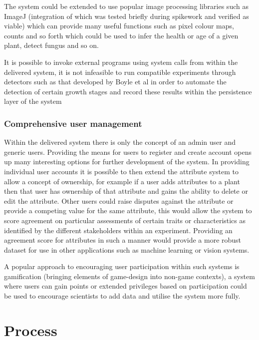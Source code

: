 The system could be extended to use popular image processing libraries such as ImageJ (integration of which was tested briefly during spikework and verified as viable) which can provide many useful functions such as pixel colour maps, counts and so forth which could be used to infer the health or age of a given plant, detect fungus and so on. 

It is possible to invoke external programs using system calls from within the delivered system, it is not infeasible to run compatible experiments through detectors such as that developed by Boyle et al\cite{boyle_image-based_2015} in order to automate the detection of certain growth stages and record these results within the persistence layer of the system


\subsubsection{Comprehensive user management}
Within the delivered system there is only the concept of an admin user and generic users. Providing the means for users to register and create account opens up many interesting options for further development of the system. In providing individual user accounts it is possible to then extend the attribute system to allow a concept of ownership, for example if a user adds attributes to a plant then that user has ownership of that attribute and gains the ability to delete or edit the attribute. Other users could raise disputes against the attribute or provide a competing value for the same attribute, this would allow the system to score agreement on particular assessments of certain traits or characteristics as identified by the different stakeholders within an experiment. Providing an agreement score for attributes in such a manner would provide a more robust dataset for use in other applications such as machine learning or vision systems.

A popular approach to encouraging user participation within such systems is gamification (bringing elements of game-design into non-game contexts), a system where users can gain points or extended privileges based on participation could be used to encourage scientists to add data and utilise the system more fully. 




\section{Process}

